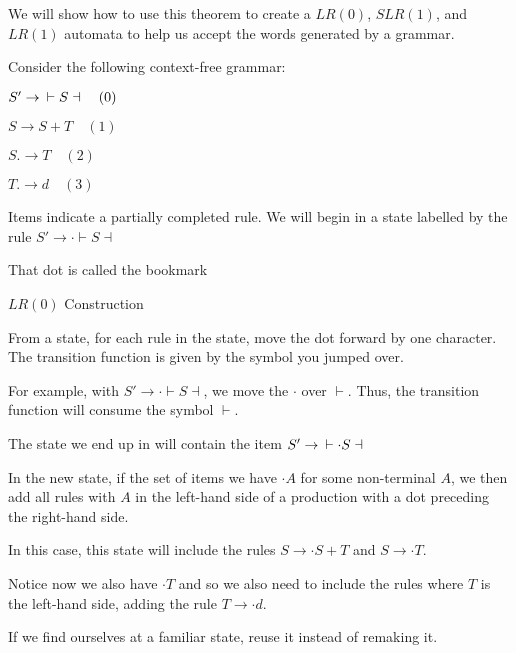 \documentclass{article}
\begin{document}

We will show how to use this theorem to create a \(LR(0)\), \(SLR(1)\),
and \(LR(1)\) automata to help us accept the words generated by a
grammar.

Consider the following context-free grammar:

\(S' \to \mkern9mu \vdash S \dashv \quad (0)\)

\(S \to S + T  \quad (1)\)

\(S. \to T  \quad (2)\)

\(T. \to d  \quad (3)\)


Items indicate a partially completed rule. We will begin in a state
labelled by the rule \(S' \to \cdot \vdash S \dashv\)

That dot is called the bookmark

\(LR(0)\) Construction

From a state, for each rule in the state, move the dot forward by one
character. The transition function is given by the symbol you jumped
over.

For example, with \(S' \to \cdot \vdash S \dashv\), we move the
\(\cdot\) over \(\vdash\). Thus, the transition function will consume
the symbol \(\vdash\).

The state we end up in will contain the item
\(S' \to\mkern9mu \vdash \cdot S \dashv\)

In the new state, if the set of items we have \(\cdot A\) for some
non-terminal \(A\), we then add all rules with \(A\) in the left-hand
side of a production with a dot preceding the right-hand side.

In this case, this state will include the rules \(S \to \cdot S + T\)
and \(S \to \cdot T\).

Notice now we also have \(\cdot T\) and so we also need to include the
rules where \(T\) is the left-hand side, adding the rule
\(T \to \cdot d\).

If we find ourselves at a familiar state, reuse it instead of remaking
it.
\end{document}
